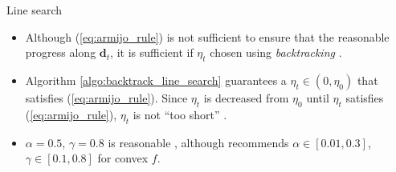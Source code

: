 \documentclass{beamer}
\numberwithin{equation}{section}
\newcommand{\aref}[1]{\alert{\ref{#1}}}
\begin{document}
\begin{frame}{Line search}
    \begin{itemize}
        \item
        Although (\aref{eq:armijo_rule}) is not sufficient to ensure that the
        reasonable progress along $ \mathbf{d}_t $, it is sufficient if
        $ \eta_t $ chosen using \textit{backtracking} \cite{nocedal_opt}.

        \medskip

	    \begin{centering}
	    \end{centering}

	    \medskip

        \item
        Algorithm \aref{algo:backtrack_line_search} guarantees a
        $ \eta_t \in (0, \eta_0) $ that satisfies (\aref{eq:armijo_rule}). 
        Since $ \eta_t $ is decreased from $ \eta_0 $ until $ \eta_t $
        satisfies (\aref{eq:armijo_rule}), $ \eta_t $ is not ``too short''
        \cite{nocedal_opt}.

        \item
        $ \alpha = 0.5 $, $ \gamma = 0.8 $ is reasonable
        \cite{stat_learn_sparsity}, although \cite{bv_convex_opt} recommends
        $ \alpha \in [0.01, 0.3] $, $ \gamma \in [0.1, 0.8] $ for convex $ f $.
    \end{itemize}
\end{frame}
\end{document}
